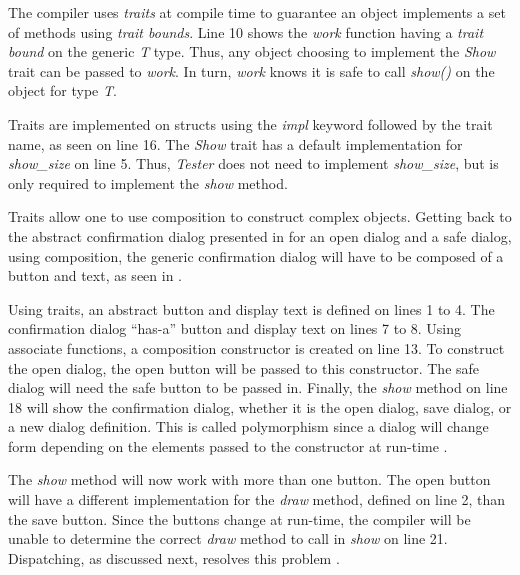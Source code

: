 
The compiler uses \textit{traits} at compile time to guarantee an object implements a set of methods using \textit{trait bounds}.
Line 10 shows the \textit{work} function having a \textit{trait bound} on the generic \textit{T} type.
Thus, any object choosing to implement the \textit{Show} trait can be passed to \textit{work}.
In turn, \textit{work} knows it is safe to call \textit{show()} on the object for type \textit{T}.


Traits are implemented on structs using the \textit{impl} keyword followed by the trait name, as seen on line 16.
The \textit{Show} trait has a default implementation for \textit{show\_size} on line 5.
Thus, \textit{Tester} does not need to implement \textit{show\_size}, but is only required to implement the \textit{show} method.

Traits allow one to use composition to construct complex objects.
Getting back to the abstract confirmation dialog presented in  for an open dialog and a safe dialog, using composition, the generic confirmation dialog will have to be composed of a button and text, as seen in .


Using traits, an abstract button and display text is defined on lines 1 to 4.
The confirmation dialog ``has-a'' \cite{malik_09_01} button and display text on lines 7 to 8.
Using associate functions\footnotemark[\ref{associate}], a composition constructor is created on line 13.
To construct the open dialog, the open button will be passed to this constructor.
The safe dialog will need the safe button to be passed in.
Finally, the \textit{show} method on line 18 will show the confirmation dialog, whether it is the open dialog, save dialog, or a new dialog definition.
This is called polymorphism since a dialog will change form depending on the elements passed to the constructor at run-time \cite{savitch_15_01,malik_09_01,gamma_94_01}.

The \textit{show} method will now work with more than one button.
The open button will have a different implementation for the \textit{draw} method, defined on line 2, than the save button.
Since the buttons change at run-time, the compiler will be unable to determine the correct \textit{draw} method to call in \textit{show} on line 21.
Dispatching, as discussed next, resolves this problem \cite{pierce_02_01}.

